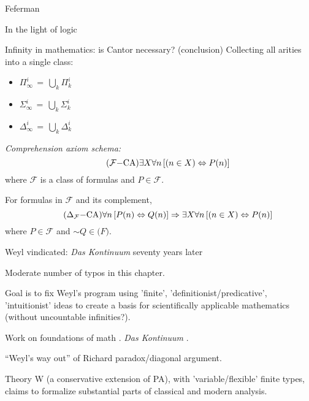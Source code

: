 \begin{plSection}{Feferman}
\begin{plSection}{In the light of logic}
\begin{plSection}{Infinity in mathematics: is Cantor necessary? (conclusion)}
Collecting all arities into a single class:
\begin{itemize}
  \item $\Pi^i_{\infty} \, = \, \bigcup_k \Pi^i_k$
  \item $\Sigma^i_{\infty} \, = \, \bigcup_k \Sigma^i_k$
  \item $\Delta^i_{\infty} \, = \, \bigcup_k \Delta^i_k$
\end{itemize}

\textit{Comprehension axiom schema:}
\begin{equation}
\tag{$\mathcal{F}{-}\text{CA}$}
\exists X \forall n \left[ (n \in X) \Leftrightarrow P(n) \right]
\end{equation}
where $\mathcal{F}$ is a class of formulas 
and $P \in \mathcal{F}$.

For formulas in $\mathcal{F}$ and its complement,
\begin{equation}
\tag{$\Delta_{\mathcal{F}}{-}\text{CA}$}
\forall n \left[ P(n) \Leftrightarrow Q(n) \right]
\Rightarrow 
\exists X \forall n \left[ (n \in X) \Leftrightarrow P(n) \right]
\end{equation}
where $P \in \mathcal{F}$ and $\sim Q \in \mathcal(F)$.

\end{plSection}%
\begin{plSection}{Weyl vindicated: \textit{Das Kontinuum} seventy years later}
\label{sec:Weyl_vindicated}

Moderate number of typos in this 
chapter. 

Goal is to fix Weyl's program 
using 'finite', 'definitionist/predicative', 'intuitionist' ideas
to create a basis for scientifically applicable mathematics
(without uncountable infinities?).

Work on foundations of math .
\textit{Das Kontinuum} .

``Weyl's way out'' of Richard paradox/diagonal 
argument.~\cite[p 262]{Feferman:1998:LightOfLogic} 

Theory W (a conservative extension of PA),
with 'variable/flexible' finite types,
claims to formalize substantial parts of
classical and modern 
analysis.~\cite[ch~13 sec~8]{Feferman:1998:LightOfLogic}


\end{plSection}
\end{plSection}
\end{plSection}
